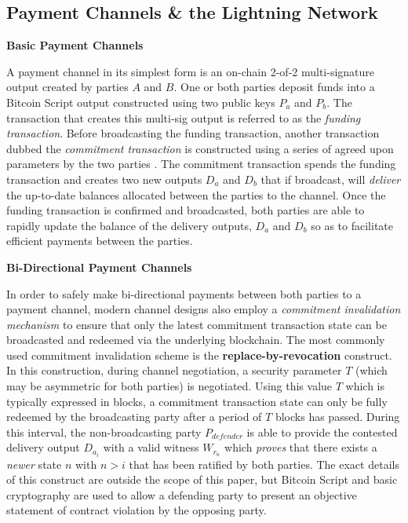 \documentclass[10pt,a4paper]{article}
\theoremstyle{definition}
\begin{document}
\subsection{Payment Channels \& the Lightning Network}

\begin{center}
\textbf{Basic Payment Channels}
\end{center}

A payment channel in its simplest form is an on-chain 2-of-2 multi-signature
output created by parties $A$ and $B$. One or both parties deposit funds into a
Bitcoin Script output constructed using two public keys $P_{a}$ and $P_{b}$.
The transaction that creates this multi-sig output is referred to as the
\emph{funding transaction}. Before broadcasting the funding transaction,
another transaction dubbed the \emph{commitment transaction} is constructed
using a series of agreed upon parameters by the two parties \cite{bolt3}. The
commitment transaction spends the funding transaction and creates two new
outputs $D_{a}$ and $D_{b}$ that if broadcast, will \emph{deliver} the
up-to-date balances allocated between the parties to the channel. Once the
funding transaction is confirmed and broadcasted, both parties are able to
rapidly update the balance of the delivery outputs, $D_{a}$ and $D_{b}$ so as
to facilitate efficient payments between the parties. \\

\begin{center}
\textbf{Bi-Directional Payment Channels}
\end{center}

In order to safely make bi-directional payments between both parties to a
payment channel, modern channel designs also employ a \emph{commitment
invalidation mechanism} \cite{chanSok} to ensure that only the latest
commitment transaction state can be broadcasted and redeemed via the underlying
blockchain. The most commonly used commitment invalidation scheme is the
\textbf{replace-by-revocation} construct. In this construction, during channel
negotiation, a security parameter $T$ (which may be asymmetric for both
parties) is negotiated. Using this value $T$ which is typically expressed in
blocks, a commitment transaction state can only be fully redeemed by the
broadcasting party after a period of $T$ blocks has passed. During this
interval, the non-broadcasting party $P_{defender}$ is able to provide the
contested delivery output $D_{a_i}$ with a valid witness $W_{r_n}$ which
\emph{proves} that there exists a  \emph{newer} state $n$ with $n > i$ that has
been ratified by both parties. The exact details of this construct are outside
the scope of this paper, but Bitcoin Script and basic cryptography are used to
allow a defending party to present an objective statement of contract violation
by the opposing party. \\
\end{document}
